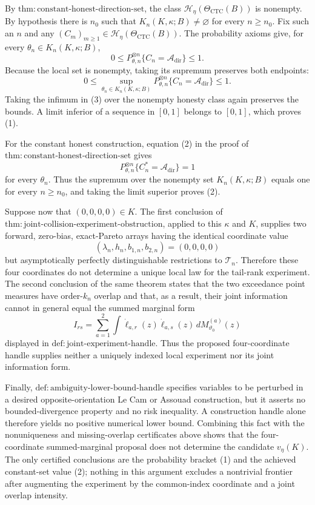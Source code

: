 By \(\mathrm{thm{:}constant\text{-}honest\text{-}direction\text{-}set}\), the class \(\mathcal H_\eta(\Theta_{\mathrm{CTC}}(B))\) is nonempty.  By hypothesis there is \(n_0\) such that \(K_n(K,\kappa;B)\neq\varnothing\) for every \(n\geq n_0\).  Fix such an \(n\) and any \((C_m)_{m\geq1}\in\mathcal H_\eta(\Theta_{\mathrm{CTC}}(B))\).  The probability axioms give, for every \(\theta_n\in K_n(K,\kappa;B)\),
\[
 0\leq P_{\theta,n}^{\otimes n}\{C_n=\mathcal A_{\mathrm{dir}}\}\leq1.
\]
Because the local set is nonempty, taking its supremum preserves both endpoints:
\[
 0\leq
 \sup_{\theta_n\in K_n(K,\kappa;B)}
 P_{\theta,n}^{\otimes n}\{C_n=\mathcal A_{\mathrm{dir}}\}
 \leq1. \tag{3}
\]
Taking the infimum in (3) over the nonempty honesty class again preserves the bounds.  A limit inferior of a sequence in \([0,1]\) belongs to \([0,1]\), which proves (1).

For the constant honest construction, equation (2) in the proof of \(\mathrm{thm{:}constant\text{-}honest\text{-}direction\text{-}set}\) gives
\[
 P_{\theta,n}^{\otimes n}\{C_n^*=\mathcal A_{\mathrm{dir}}\}=1
\]
for every \(\theta_n\).  Thus the supremum over the nonempty set \(K_n(K,\kappa;B)\) equals one for every \(n\geq n_0\), and taking the limit superior proves (2).

Suppose now that \((0,0,0,0)\in K\).  The first conclusion of \(\mathrm{thm{:}joint\text{-}collision\text{-}experiment\text{-}obstruction}\), applied to this \(\kappa\) and \(K\), supplies two forward, zero-bias, exact-Pareto arrays having the identical coordinate value
\[
 (\lambda_n,h_n,b_{1,n},b_{2,n})=(0,0,0,0)
\]
but asymptotically perfectly distinguishable restrictions to \(\mathcal T_n\).  Therefore these four coordinates do not determine a unique local law for the tail-rank experiment.  The second conclusion of the same theorem states that the two exceedance point measures have order-\(k_n\) overlap and that, as a result, their joint information cannot in general equal the summed marginal form
\[
 I_{rs}=\sum_{a=1}^2\int
 \dot\ell_{a,r}(z)\dot\ell_{a,s}(z)\,dM_{\vartheta_0}^{(a)}(z)
\]
displayed in \(\mathrm{def{:}joint\text{-}experiment\text{-}handle}\).  Thus the proposed four-coordinate handle supplies neither a uniquely indexed local experiment nor its joint information form.

Finally, \(\mathrm{def{:}ambiguity\text{-}lower\text{-}bound\text{-}handle}\) specifies variables to be perturbed in a desired opposite-orientation Le Cam or Assouad construction, but it asserts no bounded-divergence property and no risk inequality.  A construction handle alone therefore yields no positive numerical lower bound.  Combining this fact with the nonuniqueness and missing-overlap certificates above shows that the four-coordinate summed-marginal proposal does not determine the candidate \(v_\eta(K)\).  The only certified conclusions are the probability bracket (1) and the achieved constant-set value (2); nothing in this argument excludes a nontrivial frontier after augmenting the experiment by the common-index coordinate and a joint overlap intensity.